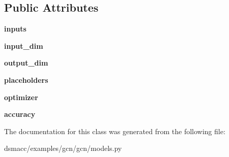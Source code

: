 \subsection*{Public Attributes}
\begin{DoxyCompactItemize}
\item 
\mbox{\label{classgcn_1_1models_1_1MLP_a9a1ad457fafd62d8eb0313c12ed67e9e}} 
{\bfseries inputs}
\item 
\mbox{\label{classgcn_1_1models_1_1MLP_ae4f4d7dfb7ac403125c1ad8a3c583075}} 
{\bfseries input\+\_\+dim}
\item 
\mbox{\label{classgcn_1_1models_1_1MLP_a1c1a4162c19f8d1886a33b22b48a0442}} 
{\bfseries output\+\_\+dim}
\item 
\mbox{\label{classgcn_1_1models_1_1MLP_a0f2fe8849a5f25f7f1adee24967dcb5e}} 
{\bfseries placeholders}
\item 
\mbox{\label{classgcn_1_1models_1_1MLP_a5844d1fd06ea8e2768aea12ed7db82e5}} 
{\bfseries optimizer}
\item 
\mbox{\label{classgcn_1_1models_1_1MLP_ad9e7aa6e4e2c2e5fc61adb385909cb59}} 
{\bfseries accuracy}
\end{DoxyCompactItemize}


The documentation for this class was generated from the following file\+:\begin{DoxyCompactItemize}
\item 
dsmacc/examples/gcn/gcn/models.\+py\end{DoxyCompactItemize}
